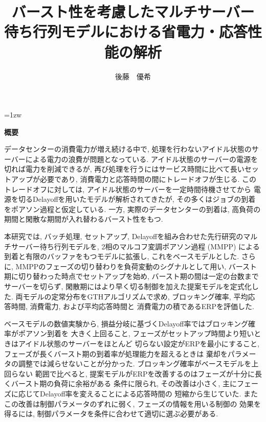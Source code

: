 \documentclass[a4paper, 11pt, dvipdfmx]{jsreport}
\title{バースト性を考慮したマルチサーバー\\
待ち行列モデルにおける省電力・応答性能の解析}
\author{後藤　優希}
\begin{document}
\pagestyle{empty}
\maketitle

\thispagestyle{empty}
\vspace*{20pt plus 1fil}
\parindent=1zw
\noindent
\begin{center}
{\bf 概要}
\vspace{5mm}
\end{center}

データセンターの消費電力が増え続ける中で, 処理を行わないアイドル状態のサーバーによる電力の浪費が問題となっている.
アイドル状態のサーバーの電源を切れば電力を削減できるが, 再び処理を行うにはサービス時間に比べて長いセットアップが必要であり,
消費電力と応答時間の間にトレードオフが生じる. このトレードオフに対しては, アイドル状態のサーバーを一定時間待機させてから
電源を切るDelayoffを用いたモデルが解析されてきたが, その多くはジョブの到着をポアソン過程と仮定している.
一方, 実際のデータセンターの到着は, 高負荷の期間と閑散な期間が入れ替わるバースト性をもつ.

本研究では, バッチ処理, セットアップ, Delayoffを組み合わせた先行研究のマルチサーバー待ち行列モデルを,
2相のマルコフ変調ポアソン過程 (MMPP) による到着と有限のバッファをもつモデルに拡張し, これをベースモデルとした.
さらに, MMPPのフェーズの切り替わりを負荷変動のシグナルとして用い, バースト期に切り替わった時点でセットアップを始め,
バースト期の間は一定の台数までサーバーを切らず, 閑散期にはより早く切る制御を加えた提案モデルを定式化した.
両モデルの定常分布をGTHアルゴリズムで求め, ブロッキング確率, 平均応答時間, 消費電力, および平均応答時間と
消費電力の積であるERPを評価した.

ベースモデルの数値実験から, 損益分岐に基づくDelayoff率ではブロッキング確率がポアソン到着を
大きく上回ること, フェーズがセットアップ時間より短いときはアイドル状態のサーバーをほとんど
切らない設定がERPを最小にすること, フェーズが長くバースト期の到着率が処理能力を超えるときは
棄却をパラメータの調整では減らせないことが分かった. ブロッキング確率がベースモデルを上回らない
範囲で比べると, 提案モデルがERPを改善するのはフェーズが十分に長くバースト期の負荷に余裕がある
条件に限られ, その改善は小さく, 主にフェーズに応じてDelayoff率を変えることによる応答時間の
短縮から生じていた. またこの改善は制御パラメータのずれに弱く, フェーズの情報を用いる制御の
効果を得るには, 制御パラメータを条件に合わせて適切に選ぶ必要がある.

\par
\vspace{0pt plus 1fil}
\newpage
\end{document}
